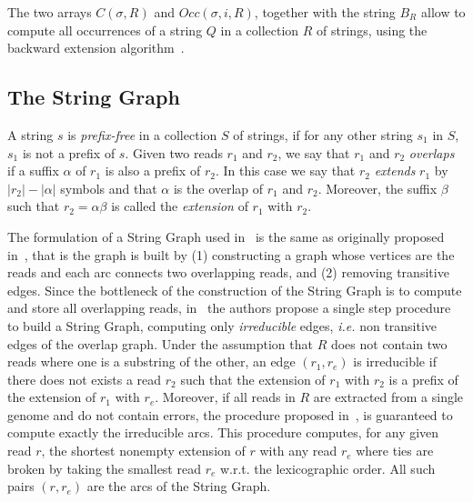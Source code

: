 \documentclass[runningheads,envcountsame,a4paper]{llncs}
\newcommand{\ie}{\textit{i.e.}\xspace}
\newcommand{\wrt}{w.r.t.\xspace}
\begin{document}
The two arrays $C(\sigma, R)$ and $Occ(\sigma, i, R)$, together with the string $B_{R}$ allow to
compute all occurrences of a string $Q$ in a
collection $R$ of strings, using the backward extension algorithm~\cite{Ferragina2000}.






\subsection{The String Graph}


A string $s$ is \emph{prefix-free} in a collection $S$ of strings, if
for any other string $s_{1}$ in $S$, $s_{1}$ is not a prefix of $s$.
Given two reads $r_1$ and $r_2$, we say that $r_1$ and $r_2$
\emph{overlaps} if a suffix $\alpha$ of $r_1$ is also a prefix of $r_2$.
In this case we
say that $r_2$ \emph{extends} $r_1$ by $|r_2|- |\alpha|$ symbols and that $\alpha$ is the overlap of $r_{1}$ and $r_{2}$.
Moreover,
the suffix $\beta$ such that $r_2 = \alpha \beta$ is called the
\emph{extension} of $r_1$ with $r_{2}$.

The formulation of a String Graph used in~\cite{Simpson2010} is the same as
originally proposed in~\cite{Myers2005}, that is the graph is built by (1)
constructing a graph whose vertices are the reads and each arc connects two overlapping reads, and (2)
removing transitive edges.
Since the bottleneck of the construction of the String Graph is to compute and store all overlapping reads,
in~\cite{Simpson2010} the authors propose a single step procedure to build a
String Graph, computing only \emph{irreducible} edges, \ie non
transitive edges of the overlap graph.
Under the assumption that $R$ does not contain two reads where one is a substring of the other,
an edge $(r_{1}, r_e)$ is irreducible if there does not exists a read $r_{2}$
such that
the extension of $r_{1}$ with $r_2$ is a prefix of
the extension of $r_{1}$ with $r_e$.
Moreover, if all reads in $R$ are extracted from a single genome and do not contain errors,
the procedure proposed in~\cite{Simpson2010}, is guaranteed to compute exactly the irreducible arcs.
This procedure computes, for any given read $r$, the shortest nonempty extension of $r$ with any read $r_{e}$
where ties are broken by taking the smallest read $r_{e}$ \wrt the lexicographic order.
All such pairs $(r, r_{e})$ are the arcs of the String Graph.
\end{document}
